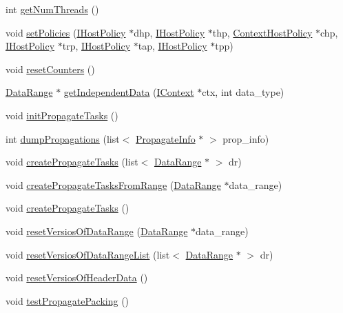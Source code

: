\begin{DoxyCompactItemize}
\item 
int \hyperlink{class_global_context_acec7514378c7877e7ba92d23538ae05e}{getNumThreads} ()
\item 
void \hyperlink{class_global_context_a764ed43467db5334719f4bfdddc4dc6b}{setPolicies} (\hyperlink{class_i_host_policy}{IHostPolicy} $\ast$dhp, \hyperlink{class_i_host_policy}{IHostPolicy} $\ast$thp, \hyperlink{class_context_host_policy}{ContextHostPolicy} $\ast$chp, \hyperlink{class_i_host_policy}{IHostPolicy} $\ast$trp, \hyperlink{class_i_host_policy}{IHostPolicy} $\ast$tap, \hyperlink{class_i_host_policy}{IHostPolicy} $\ast$tpp)
\item 
void \hyperlink{class_global_context_a35b48731e0ef7a63c7017b57fd6c95b1}{resetCounters} ()
\item 
\hyperlink{struct_data_range}{DataRange} $\ast$ \hyperlink{class_global_context_a9cf2bd9142e7592455d0542ee457f6ff}{getIndependentData} (\hyperlink{class_i_context}{IContext} $\ast$ctx, int data\_\-type)
\item 
void \hyperlink{class_global_context_ac3f59832451f3d6b377a33ad01ea5cf5}{initPropagateTasks} ()
\item 
int \hyperlink{class_global_context_a6a4ed0adbb91872d956babaf32e3466c}{dumpPropagations} (list$<$ \hyperlink{struct_propagate_info}{PropagateInfo} $\ast$ $>$ prop\_\-info)
\item 
void \hyperlink{class_global_context_a0f3857165a2d4571d6ae82b86c6becbe}{createPropagateTasks} (list$<$ \hyperlink{struct_data_range}{DataRange} $\ast$ $>$ dr)
\item 
void \hyperlink{class_global_context_a24052ad1a783fc8860d47f6da220c321}{createPropagateTasksFromRange} (\hyperlink{struct_data_range}{DataRange} $\ast$data\_\-range)
\item 
void \hyperlink{class_global_context_ad56737fc110208d85069ac902b4cb97b}{createPropagateTasks} ()
\item 
void \hyperlink{class_global_context_a55ae2af04ecff458dece28649354a04f}{resetVersiosOfDataRange} (\hyperlink{struct_data_range}{DataRange} $\ast$data\_\-range)
\item 
void \hyperlink{class_global_context_acc65a1acfefed680d1d05345d1bf9ab8}{resetVersiosOfDataRangeList} (list$<$ \hyperlink{struct_data_range}{DataRange} $\ast$ $>$ dr)
\item 
void \hyperlink{class_global_context_aa903129142d1e7420aa521b89e77789b}{resetVersiosOfHeaderData} ()
\item 
void \hyperlink{class_global_context_a45180bd1ced20471a3489200c235ed37}{testPropagatePacking} ()

\end{DoxyCompactItemize}

